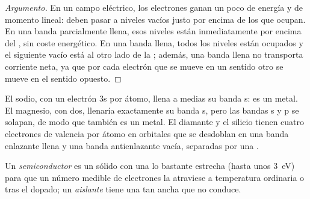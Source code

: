 \begin{proof}[Argumento]
En un campo eléctrico, los electrones ganan un poco de energía y de momento lineal: deben
pasar a niveles vacíos justo por encima de los que ocupan. En una banda parcialmente
llena, esos niveles están inmediatamente por encima del , sin coste energético. En
una banda llena, todos los niveles están ocupados y el siguiente vacío está al otro lado de la ;
además, una banda llena no transporta corriente neta, ya que por cada electrón que se mueve
en un sentido otro se mueve en el sentido opuesto.
\end{proof}

El sodio, con un electrón 3s por átomo, llena a medias su banda s: es un metal.
El magnesio, con dos, llenaría exactamente su banda s, pero las bandas s y p
se solapan, de modo que también es un metal. El diamante y el silicio tienen cuatro electrones de valencia
por átomo en orbitales que se desdoblan en una banda enlazante llena y una banda
antienlazante vacía, separadas por una .

\begin{definition}\label{def:b3:solid-state:classes}
Un \emph{semiconductor} es un sólido con una  lo bastante
estrecha (hasta unos \qty{3}{eV}) para que un número medible de electrones la atraviese
a temperatura ordinaria o tras el dopado; un \emph{aislante}
tiene una  tan ancha que no conduce.
\end{definition}

